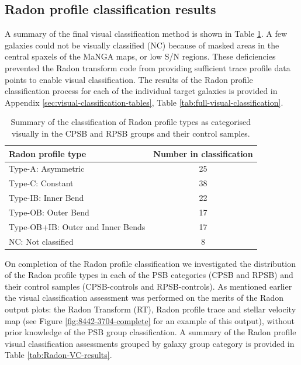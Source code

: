 \subsection{Radon profile classification results}
\label{sec:Radon-profile-classification}

A summary of the final visual classification method is shown in Table \ref{tab:Radon-class-summary}.  A few galaxies could not be visually classified (NC) because of masked areas in the central spaxels of the MaNGA maps, or low S/N regions. These deficiencies prevented the Radon transform code from providing sufficient trace profile data points to enable visual classification. The results of the Radon profile classification process for each of the individual target galaxies is provided in Appendix \ref{sec:visual-classification-tables}, Table \ref{tab:full-visual-classification}. 

\begin{table}
    \centering
    \caption[Summary of Radon profile type visual classifications]{Summary of the classification of Radon profile types as categorised visually in the CPSB and RPSB groups and their control samples.}
    \label{tab:Radon-class-summary}
    \begin{tabular}{lc}
    \hline
    Radon profile type & Number in classification \\
    \hline
    Type-A: Asymmetric & 25 \\
    Type-C: Constant & 38 \\
    Type-IB: Inner Bend & 22 \\
    Type-OB: Outer Bend & 17 \\
    Type-OB+IB: Outer and Inner Bends & 17 \\
    NC: Not classified & 8 \\
    \hline
    \end{tabular}
\end{table}

On completion of the Radon profile classification we investigated the distribution of the Radon profile types in each of the PSB categories (CPSB and RPSB) and their control samples (CPSB-controls and RPSB-controls). As mentioned earlier the visual classification assessment was performed on the merits of the Radon output plots: the Radon Transform (RT), Radon profile trace and stellar velocity map (see Figure \ref{fig:8442-3704-complete} for an example of this output), without prior knowledge of the PSB group classification. A summary of the Radon profile visual classification assessments grouped by galaxy group category is provided in Table \ref{tab:Radon-VC-results}.


